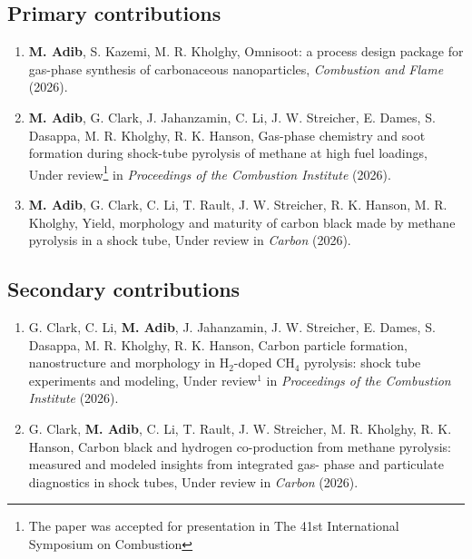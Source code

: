 \begin{publications}
	\subsection*{Primary contributions}
	
	\begin{enumerate}
		\item \textbf{M. Adib}, S. Kazemi, M. R. Kholghy, Omnisoot: a process design package for gas-phase synthesis of carbonaceous nanoparticles, \textit{Combustion and Flame} (2026).
		
		\item \textbf{M. Adib}, G. Clark, J. Jahanzamin, C. Li,
		J. W. Streicher, E. Dames, S. Dasappa, M. R. Kholghy, R. K. Hanson, Gas-phase chemistry and soot formation during shock-tube pyrolysis of methane at high fuel loadings, Under review\footnote{The paper was accepted for presentation in The 41st International Symposium on Combustion} in \textit{Proceedings of the Combustion Institute} (2026).
		
		\item \textbf{M. Adib}, G. Clark, C. Li,
		T. Rault, J. W. Streicher, R. K. Hanson, M. R. Kholghy, Yield, morphology and maturity of carbon black made by
		methane pyrolysis in a shock tube, Under review in \textit{Carbon} (2026).
	\end{enumerate}


\subsection*{Secondary contributions}
	\begin{enumerate}
	\item G. Clark, C. Li, \textbf{M. Adib}, J. Jahanzamin,
	J. W. Streicher, E. Dames, S. Dasappa, M. R. Kholghy, R. K. Hanson, Carbon particle formation, nanostructure and morphology in H$_2$-doped CH$_4$ pyrolysis: shock tube experiments and modeling, Under review$^1$ in \textit{Proceedings of the Combustion Institute} (2026).
	
	\item G. Clark, \textbf{M. Adib}, C. Li,
	T. Rault, J. W. Streicher, M. R. Kholghy, R. K. Hanson, Carbon black and hydrogen co-production from methane pyrolysis: measured and modeled insights from integrated gas-
	phase and particulate diagnostics in shock tubes, Under review in \textit{Carbon} (2026).
	
\end{enumerate}		
	
\end{publications}